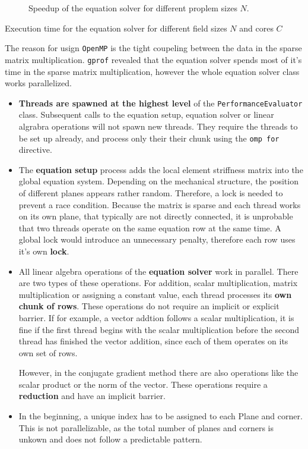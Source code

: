 \documentclass[12pt]{article}
\begin{document}
\begin{figure}[p]
    \centering
    
    \caption{Speedup of the equation solver for different proplem sizes $N$.}
    \label{fig:Speedup}
\end{figure}

\begin{table}[p]
    \centering
    
    \caption{Execution time for the equation solver for different field sizes $N$ and cores $C$}
    \label{tab:Speedup}
\end{table}

The reason for usign \texttt{OpenMP} is the tight coupeling between the data in the sparse matrix multiplication. \texttt{gprof} revealed that the equation solver spends most of it's time in the sparse matrix multiplication, however the whole equation solver class works parallelized.

\begin{itemize}
    \item \textbf{Threads are spawned at the highest level} of the \texttt{PerformanceEvaluator} class. Subsequent calls to the equation setup, equation solver or linear algrabra operations will not spawn new threads. They require the threads to be set up already, and process only their their chunk using the \texttt{omp for} directive.
    \item The \textbf{equation setup} process adds the local element striffness matrix into the global equation system. Depending on the mechanical structure, the position of different planes appears rather random. Therefore, a lock is needed to prevent a race condition. Because the matrix is sparse and each thread works on its own plane, that typically are not directly connected, it is unprobable that two threads operate on the same equation row at the same time. A global lock would introduce an unnecessary penalty, therefore each row uses it's own \textbf{lock}.
    \item All linear algebra operations of the \textbf{equation solver} work in parallel. There are two types of these operations. For addition, scalar multiplication, matrix multiplication or assigning a constant value, each thread processes its \textbf{own chunk of rows}. These operations do not require an implicit or explicit barrier. If for example, a vector addtion follows a scalar multiplication, it is fine if the first thread begins with the scalar multiplication before the second thread has finished the vector addition, since each of them operates on its own set of rows.
    
    However, in the conjugate gradient method there are also operations like the scalar product or the norm of the vector. These operations require a \textbf{reduction} and have an implicit barrier.
    \item In the beginning, a unique index has to be assigned to each Plane and corner. This is not parallelizable, as the total number of planes and corners is unkown and does not follow a predictable pattern.
\end{itemize}
\end{document}
